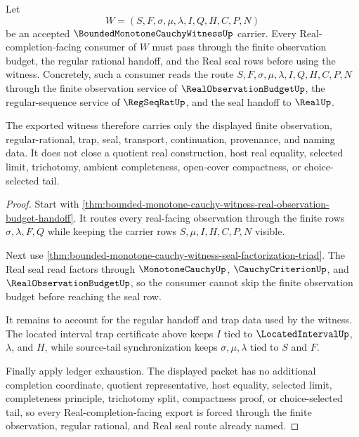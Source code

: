 \begin{theorem}
\label{thm:bounded-monotone-cauchy-witness-real-completion-export}
Let
$$
W=(S,F,\sigma,\mu,\lambda,I,Q,H,C,P,N)
$$
be an accepted $\BoundedMonotoneCauchyWitnessUp$ carrier. Every Real-completion-facing consumer of $W$ must pass through the finite observation budget, the regular rational handoff, and the Real seal rows before using the witness. Concretely, such a consumer reads the route $S,F,\sigma,\mu,\lambda,I,Q,H,C,P,N$ through the finite observation service of $\RealObservationBudgetUp$, the regular-sequence service of $\RegSeqRatUp$, and the seal handoff to $\RealUp$.

The exported witness therefore carries only the displayed finite observation, regular-rational, trap, seal, transport, continuation, provenance, and naming data. It does not close a quotient real construction, host real equality, selected limit, trichotomy, ambient completeness, open-cover compactness, or choice-selected tail.
\end{theorem}
\begin{proof}
Start with \autoref{thm:bounded-monotone-cauchy-witness-real-observation-budget-handoff}. It routes every real-facing observation through the finite rows $\sigma,\lambda,F,Q$ while keeping the carrier rows $S,\mu,I,H,C,P,N$ visible.

Next use \autoref{thm:bounded-monotone-cauchy-witness-seal-factorization-triad}. The Real seal read factors through $\MonotoneCauchyUp$, $\CauchyCriterionUp$, and $\RealObservationBudgetUp$, so the consumer cannot skip the finite observation budget before reaching the seal row.

It remains to account for the regular handoff and trap data used by the witness. The located interval trap certificate above keeps $I$ tied to $\LocatedIntervalUp$, $\lambda$, and $H$, while source-tail synchronization keeps $\sigma,\mu,\lambda$ tied to $S$ and $F$.

Finally apply ledger exhaustion. The displayed packet has no additional completion coordinate, quotient representative, host equality, selected limit, completeness principle, trichotomy split, compactness proof, or choice-selected tail, so every Real-completion-facing export is forced through the finite observation, regular rational, and Real seal route already named.
\end{proof}

